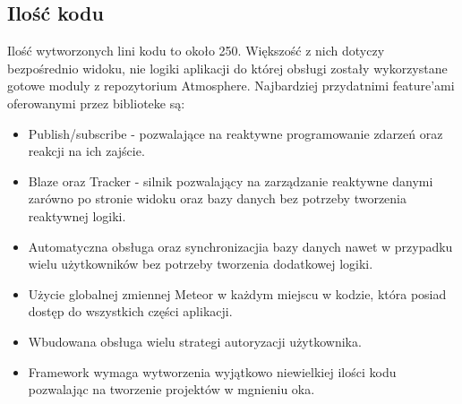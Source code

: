\documentclass[12pt]{report}
\begin{document}
    \subsection{Ilość kodu}
      Ilość wytworzonych lini kodu to około 250.
      Większość z nich dotyczy bezpośrednio widoku, nie logiki aplikacji do której obsługi zostały wykorzystane gotowe moduly z repozytorium Atmosphere.
      Najbardziej przydatnimi feature'ami oferowanymi przez biblioteke są:
      \begin{itemize}
        \item Publish/subscribe - pozwalające na reaktywne programowanie zdarzeń oraz reakcji na ich zajście.
        \item Blaze oraz Tracker - silnik pozwalający na zarządzanie reaktywne danymi zarówno po stronie widoku oraz bazy danych bez potrzeby tworzenia reaktywnej logiki.
        \item Automatyczna obsługa oraz synchronizacjia bazy danych nawet w przypadku wielu użytkowników bez potrzeby tworzenia dodatkowej logiki.
        \item Użycie globalnej zmiennej Meteor w każdym miejscu w kodzie, która posiad dostęp do wszystkich części aplikacji.
        \item Wbudowana obsługa wielu strategi autoryzacji użytkownika.
        \item Framework wymaga wytworzenia wyjątkowo niewielkiej ilości kodu pozwalając na tworzenie projektów w mgnieniu oka.
      \end{itemize}
\end{document}
